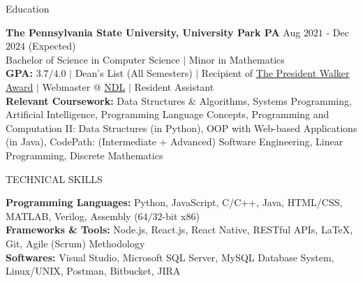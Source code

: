 \documentclass{resume} %
\begin{document}

\begin{rSection}{Education}

{\bf The Pennsylvania State University, University Park PA} \hfill {Aug $2021$ - Dec $2024$ (Expected)}\\
{Bachelor of Science in Computer Science $\vert$ Minor in Mathematics}\\
{\bf GPA:} $3.7/4.0$ $\vert$ Dean's List (All Semesters) $\vert$ Recipient of \href{https://awardsrecognition.psu.edu/student/undergraduate-scholastic-awards/}{The President Walker Award} $\vert$ Webmaster @ \href{https://ndl.psu.edu/}{NDL} $\vert$ Resident Assistant\\
{\bf Relevant Coursework:} Data Structures \& Algorithms, Systems Programming, Artificial Intelligence, Programming Language Concepts, Programming and Computation II: Data Structures (in Python), OOP with Web-based Applications (in Java), CodePath: (Intermediate + Advanced) Software Engineering, Linear Programming, Discrete Mathematics
\end{rSection}


\begin{rSection}{TECHNICAL SKILLS}

{\bf Programming Languages:} Python, JavaScript, C/C++, Java, HTML/CSS, MATLAB, Verilog, Assembly ($64/32$-bit x$86$)\\
{\bf Frameworks \& Tools:} Node.js, React.js, React Native, RESTful APIs, \LaTeX, Git, Agile (Scrum) Methodology\\
{\bf Softwares:} Visual Studio, Microsoft SQL Server, MySQL Database System, Linux/UNIX, Postman, Bitbucket, JIRA

\end{rSection}
\end{document}
